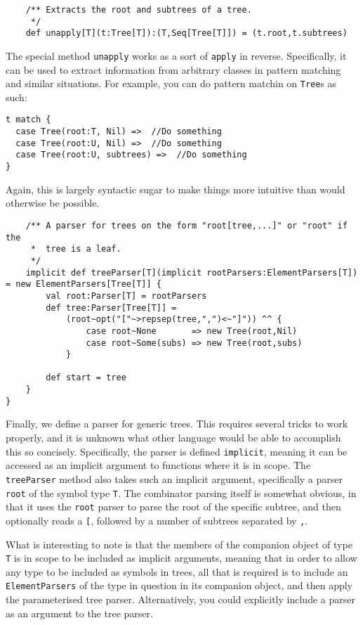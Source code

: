 \begin{verbatim}
	/** Extracts the root and subtrees of a tree.
	 */
	def unapply[T](t:Tree[T]):(T,Seq[Tree[T]]) = (t.root,t.subtrees)
\end{verbatim}

The special method \texttt{unapply} works as a sort of \texttt{apply} in
reverse. Specifically, it can be used to extract information from arbitrary
classes in pattern matching and similar situations. For example, you can do
pattern matchin on \texttt{Tree}s as such:

\begin{verbatim}
t match {
  case Tree(root:T, Nil) =>  //Do something 
  case Tree(root:U, Nil) =>  //Do something
  case Tree(root:U, subtrees) =>  //Do something
}
\end{verbatim}

Again, this is largely syntactic sugar to make things more intuitive than
would otherwise be possible.

\begin{verbatim}
	/** A parser for trees on the form "root[tree,...]" or "root" if the
	 *  tree is a leaf. 
	 */
	implicit def treeParser[T](implicit rootParsers:ElementParsers[T]) = new ElementParsers[Tree[T]] {
		val root:Parser[T] = rootParsers
		def tree:Parser[Tree[T]] =
			(root~opt("["~>repsep(tree,",")<~"]")) ^^ {
				case root~None       => new Tree(root,Nil)
				case root~Some(subs) => new Tree(root,subs)
			}

		def start = tree
	}
}
\end{verbatim}

Finally, we define a parser for generic trees. This requires several tricks
to work properly, and it is unknown what other language would be able to
accomplish this so concisely. Specifically, the parser is defined
\texttt{implicit}, meaning it can be accessed as an implicit argument to
functions where it is in scope. The \texttt{treeParser} method also takes
such an implicit argument, specifically a parser \texttt{root} of the
symbol type \texttt{T}. The combinator parsing itself is somewhat obvious,
in that it uses the \texttt{root} parser to parse the root of the specific
subtree, and then optionally reads a \texttt{[}, followed by a number of
subtrees separated by \texttt{,}.

What is interesting to note is that the members of the companion object of
type \texttt{T} is in scope to be included as implicit arguments, meaning
that in order to allow any type to be included as symbols in trees, all
that is required is to include an \texttt{ElementParsers} of the type in
question in its companion object, and then apply the parameterised tree
parser. Alternatively, you could explicitly include a parser as an argument
to the tree parser. %

